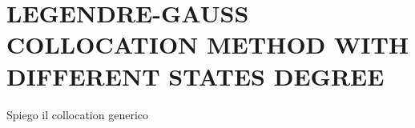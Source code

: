\section*{LEGENDRE-GAUSS COLLOCATION METHOD WITH DIFFERENT STATES DEGREE}
Spiego il collocation generico
